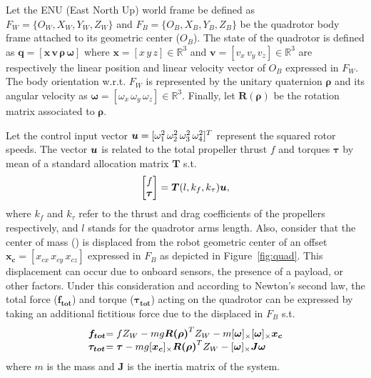 Let the ENU (East North Up) world frame be defined as $F_W \allowbreak = \allowbreak \{O_W, \allowbreak X_W, \allowbreak Y_W, \allowbreak Z_W\}$ and $F_B = \allowbreak\{O_B, \allowbreak X_B, \allowbreak Y_B, \allowbreak Z_B\}$ be the quadrotor body frame attached to its geometric center ($O_B$).
The state of the quadrotor is defined as $\boldsymbol{q} = [\boldsymbol{x}  \, \boldsymbol{v} \, \boldsymbol{\rho} \, \boldsymbol{\omega}]$ where $\boldsymbol{x} = [x \, y \,z] \in \mathbb{R}^{3}$ and $\boldsymbol{v} = [v_x \, v_y \,v_z] \in \mathbb{R}^{3}$ are respectively the linear position and linear velocity vector of $O_B$ expressed in $F_W$. The body orientation w.r.t. $F_W$ is represented by the unitary quaternion  $\boldsymbol{\rho}$ and its angular velocity as $\boldsymbol{\omega} = [\omega_x \, \omega_y \, \omega_z] \in \mathbb{R}^{3}$. 
Finally, let $\boldsymbol{R(\rho)}$ be the rotation matrix associated to $\boldsymbol{\rho}$.

Let the control input vector $\boldsymbol{u} = [\omega_{1}^2 \, \omega_{2}^2 \, \omega_{3}^2 \, \omega_{4}^2]^T$ represent the squared rotor speeds. 
The vector $\boldsymbol{u}$ is related to the total propeller thrust $f$ and torques $\boldsymbol{\tau}$ by mean of a standard allocation matrix $\boldsymbol{T}$ s.t.
\begin{equation}\label{eq:alloc_mat}
  \begin{bmatrix}
    f \\
    \boldsymbol{\tau}
    \end{bmatrix} = \boldsymbol{T}(l, k_f, k_{\tau}) \boldsymbol{u},
\end{equation}
where $k_f$ and $k_{\tau}$ refer to the thrust and drag coefficients of the propellers respectively, and $l$ stands for the quadrotor arms length.
Also, consider that the center of mass () is displaced from the robot geometric center of an offset $\boldsymbol{x_{c}} = [x_{cx} \, x_{cy} \, x_{cz}]$ expressed in $F_B$ as depicted in Figure~\ref{fig:quad}. 
This displacement can occur due to onboard sensors, the presence of a payload, or other factors.
Under this consideration and according to Newton's second law, the total force ($\boldsymbol{f_{tot}}$) and torque ($\boldsymbol{\tau_{tot}}$) acting on the quadrotor can be expressed by taking an additional fictitious force due to the displaced  in $F_B$ s.t. 
\begin{equation}\label{eq:quad_newton}
    \begin{array}{@{}l@{}l@{}}
        \boldsymbol{f_{tot}} &= f Z_W - mg\boldsymbol{R(\rho)}^TZ_W-m[\boldsymbol{\omega}]_{\times}[\boldsymbol{\omega}]_{\times}\boldsymbol{x_c} 
          
          \\
      
       \boldsymbol{\tau_{tot}} &= \boldsymbol{\tau}-mg[\boldsymbol{x_c}]_{\times}\boldsymbol{R(\rho)}^{T}Z_W - [\boldsymbol{\omega}]_{\times}\boldsymbol{J}\boldsymbol{\omega}
  \end{array}
\end{equation}
where $m$ is the mass and $\boldsymbol{J}$ is the inertia matrix of the system. 

